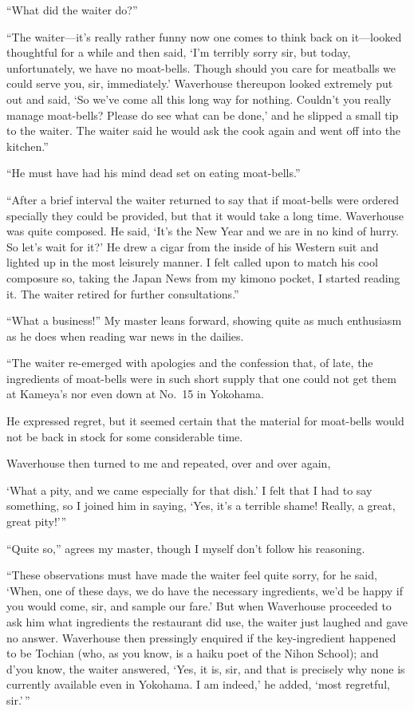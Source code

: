 \documentclass[12pt, openright]{book}
\begin{document}
``What did the waiter do?''

``The waiter---it's really rather funny now one comes to think back on
it---looked thoughtful for a while and then said, `I'm terribly sorry
sir, but today, unfortunately, we have no moat-bells. Though should you
care for meatballs we could serve you, sir, immediately.' Waverhouse
thereupon looked extremely put out and said, `So we've come all this
long way for nothing. Couldn't you really manage moat-bells? Please do
see what can be done,' and he slipped a small tip to the waiter. The
waiter said he would ask the cook again and went off into the kitchen.''

``He must have had his mind dead set on eating moat-bells.''

``After a brief interval the waiter returned to say that if moat-bells
were ordered specially they could be provided, but that it would take a
long time. Waverhouse was quite composed. He said, `It's the New Year
and we are in no kind of hurry. So let's wait for it?' He drew a cigar
from the inside of his Western suit and lighted up in the most leisurely
manner. I felt called upon to match his cool composure so, taking the
Japan News from my kimono pocket, I started reading it. The waiter
retired for further consultations.''

``What a business!'' My master leans forward, showing quite as much
enthusiasm as he does when reading war news in the dailies.

``The waiter re-emerged with apologies and the confession that, of late,
the ingredients of moat-bells were in such short supply that one could
not get them at Kameya's nor even down at No.~15 in Yokohama.

He expressed regret, but it seemed certain that the material for
moat-bells would not be back in stock for some considerable time.

Waverhouse then turned to me and repeated, over and over again,

`What a pity, and we came especially for that dish.' I felt that I had
to say something, so I joined him in saying, `Yes, it's a terrible
shame! Really, a great, great pity!'''

``Quite so,'' agrees my master, though I myself don't follow his
reasoning.

``These observations must have made the waiter feel quite sorry, for he
said, `When, one of these days, we do have the necessary ingredients,
we'd be happy if you would come, sir, and sample our fare.' But when
Waverhouse proceeded to ask him what ingredients the restaurant did use,
the waiter just laughed and gave no answer. Waverhouse then pressingly
enquired if the key-ingredient happened to be Tochian (who, as you know,
is a haiku poet of the Nihon School); and d'you know, the waiter
answered, `Yes, it is, sir, and that is precisely why none is currently
available even in Yokohama. I am indeed,' he added, `most regretful,
sir.'\,''
\end{document}
